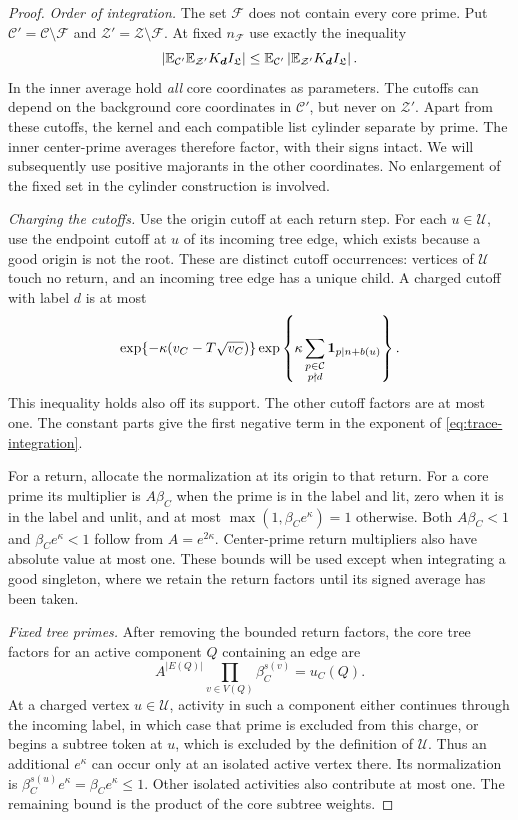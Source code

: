 \begin{proof}
\emph{Order of integration.}
The set $\mathcal F$ does not contain every core prime.  Put
$\mathcal C'=\mathcal C\setminus\mathcal F$ and
$\mathcal Z'=\mathcal Z\setminus\mathcal F$.  At fixed
$n_{\mathcal F}$ use exactly the inequality
\begin{equation}\label{eq:trace-fubini}
 \left|\mathbb E_{\mathcal C'}\mathbb E_{\mathcal Z'}
             K_{\boldsymbol d}I_{\mathfrak L}\right|
 \le \mathbb E_{\mathcal C'}
       \left|\mathbb E_{\mathcal Z'}
             K_{\boldsymbol d}I_{\mathfrak L}\right|.
\end{equation}
In the inner average hold \emph{all} core coordinates as parameters.
The cutoffs can depend on the background core coordinates in
$\mathcal C'$, but never on $\mathcal Z'$.  Apart from these cutoffs,
the kernel and each compatible list cylinder separate by prime.
The inner center-prime averages therefore factor, with their signs
intact.  We will subsequently use positive majorants in the other
coordinates.  No enlargement of the fixed set in the cylinder
construction is involved.

\emph{Charging the cutoffs.}
Use the origin cutoff at each return step.  For each $u\in\mathcal U$,
use the endpoint cutoff at $u$ of its incoming tree edge, which exists
because a good origin is not the root.  These are distinct cutoff
occurrences: vertices of $\mathcal U$ touch no return, and an incoming
tree edge has a unique child.  A charged cutoff with label $d$ is at
most
\[
 \exp\{-\kappa(v_C-T\sqrt{v_C})\}
 \exp\left\{\kappa
    \sum_{\substack{p\in\mathcal C\\p\nmid d}}
           \mathbf 1_{p\mid n+b(u)}\right\}.
\]
This inequality holds also off its support.  The other cutoff factors
are at most one.  The constant parts give the first negative term in
the exponent of \eqref{eq:trace-integration}.

For a return, allocate the normalization at its origin to that return.
For a core prime its multiplier is $A\beta_C$ when the prime is in the
label and lit, zero when it is in the label and unlit, and at most
$\max(1,\beta_Ce^\kappa)=1$ otherwise.  Both
$A\beta_C<1$ and $\beta_Ce^\kappa<1$ follow from $A=e^{2\kappa}$.
Center-prime return multipliers also have absolute value at most one.
These bounds will be used except when integrating a good singleton,
where we retain the return factors until its signed average has been
taken.

\emph{Fixed tree primes.}
After removing the bounded return factors, the core tree factors for
an active component $Q$ containing an edge are
\[
 A^{|E(Q)|}\prod_{v\in V(Q)}\beta_C^{s(v)}=u_C(Q).
\]
At a charged vertex $u\in\mathcal U$, activity in such a component
either continues through the incoming label, in which case that prime
is excluded from this charge, or begins a subtree token at $u$, which
is excluded by the definition of $\mathcal U$.  Thus an additional
$e^\kappa$ can occur only at an isolated active vertex there.  Its
normalization is $\beta_C^{s(u)}e^\kappa=\beta_Ce^\kappa\le1$.
Other isolated activities also contribute at most one.  The remaining
bound is the product of the core subtree weights.


\end{proof}
